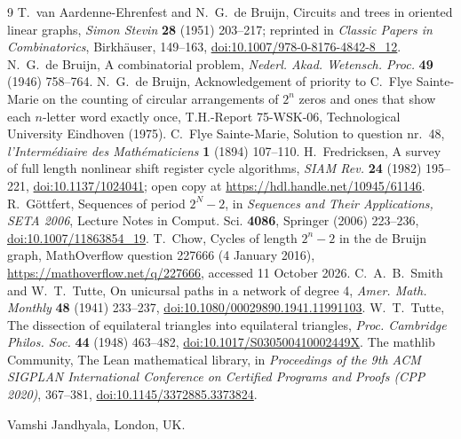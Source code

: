 \documentclass[11pt]{article}
\theoremstyle{remark}
\begin{document}
\begin{thebibliography}{9}
 T.~van Aardenne-Ehrenfest and N.~G.~de Bruijn, Circuits and trees in oriented linear graphs,
\emph{Simon Stevin} \textbf{28} (1951) 203--217; reprinted in \emph{Classic Papers in Combinatorics},
Birkh\"auser, 149--163, \href{https://doi.org/10.1007/978-0-8176-4842-8_12}{doi:10.1007/978-0-8176-4842-8\_12}.
 N.~G.~de Bruijn, A combinatorial problem, \emph{Nederl. Akad. Wetensch. Proc.} \textbf{49}
(1946) 758--764.
 N.~G.~de Bruijn, Acknowledgement of priority to C.~Flye Sainte-Marie on the counting of circular
arrangements of $2^n$ zeros and ones that show each $n$-letter word exactly once, T.H.-Report 75-WSK-06,
Technological University Eindhoven (1975).
 C.~Flye Sainte-Marie, Solution to question nr.~48, \emph{l'Interm\'ediaire des
Math\'ematiciens} \textbf{1} (1894) 107--110.
 H.~Fredricksen, A survey of full length nonlinear shift register cycle algorithms, \emph{SIAM
Rev.} \textbf{24} (1982) 195--221, \href{https://doi.org/10.1137/1024041}{doi:10.1137/1024041}; open copy at
\url{https://hdl.handle.net/10945/61146}.
 R.~G\"ottfert, Sequences of period $2^N-2$, in \emph{Sequences and Their Applications, SETA 2006},
Lecture Notes in Comput. Sci. \textbf{4086}, Springer (2006) 223--236,
\href{https://doi.org/10.1007/11863854_19}{doi:10.1007/11863854\_19}.
 T.~Chow, Cycles of length $2^n-2$ in the de Bruijn graph, MathOverflow question 227666
(4 January 2016), \url{https://mathoverflow.net/q/227666}, accessed 11 October 2026.
 C.~A.~B.~Smith and W.~T.~Tutte, On unicursal paths in a network of degree 4, \emph{Amer. Math.
Monthly} \textbf{48} (1941) 233--237,
\href{https://doi.org/10.1080/00029890.1941.11991103}{doi:10.1080/00029890.1941.11991103}.
 W.~T.~Tutte, The dissection of equilateral triangles into equilateral triangles, \emph{Proc.
Cambridge Philos. Soc.} \textbf{44} (1948) 463--482,
\href{https://doi.org/10.1017/S030500410002449X}{doi:10.1017/S030500410002449X}.
 The mathlib Community, The Lean mathematical library, in \emph{Proceedings of the 9th ACM
SIGPLAN International Conference on Certified Programs and Proofs (CPP 2020)}, 367--381,
\href{https://doi.org/10.1145/3372885.3373824}{doi:10.1145/3372885.3373824}.
\end{thebibliography}

\bigskip
\noindent Vamshi Jandhyala, London, UK.
\end{document}
